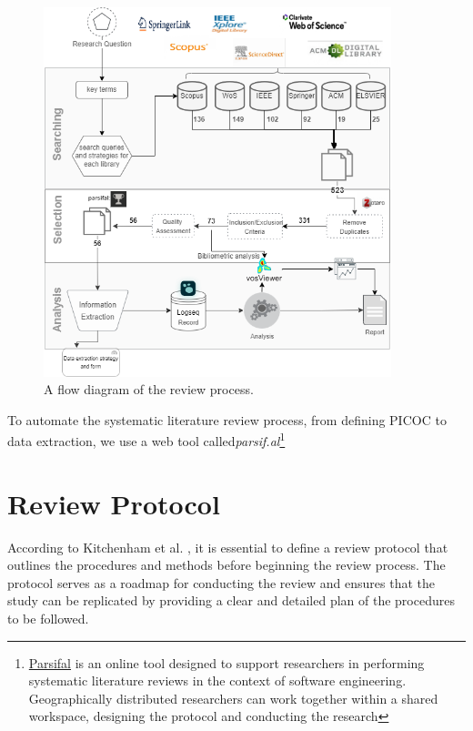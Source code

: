 \begin{figure}[H]
    \centering
    \caption{A flow diagram of the review process.}
    \includegraphics[width=0.9\textwidth]{images/slrmethoddiagram.drawio.png}
    
    \label{fig:slr-proc}
\end{figure}


To automate the systematic literature review process, from defining PICOC to data extraction, we use a web tool called\textit{parsif.al}\footnote{\href{https://parsif.al}{Parsifal} is an online tool designed to support researchers in performing systematic literature reviews in the context of software engineering. Geographically distributed researchers can work together within a shared workspace, designing the protocol and conducting the research}


\section{Review Protocol}
According to Kitchenham et al. \cite{kitchenham_guidelines_2007}, it is essential to define a review protocol that outlines the procedures and methods before beginning the review process. The protocol serves as a roadmap for conducting the review and ensures that the study can be replicated by providing a clear and detailed plan of the procedures to be followed\cite{carrera-rivera_how-conduct_2022}.

